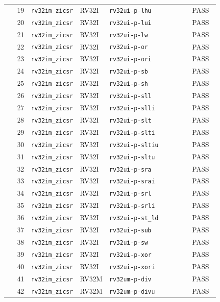 \begin{reporttable}
\begin{longtable}{@{}r p{0.22\linewidth}p{0.12\linewidth}p{0.39\linewidth}p{0.13\linewidth}@{}}
19 & \texttt{rv32im\_zicsr} & RV32I & \texttt{rv32ui-p-lhu} & PASS \\
20 & \texttt{rv32im\_zicsr} & RV32I & \texttt{rv32ui-p-lui} & PASS \\
21 & \texttt{rv32im\_zicsr} & RV32I & \texttt{rv32ui-p-lw} & PASS \\
22 & \texttt{rv32im\_zicsr} & RV32I & \texttt{rv32ui-p-or} & PASS \\
23 & \texttt{rv32im\_zicsr} & RV32I & \texttt{rv32ui-p-ori} & PASS \\
24 & \texttt{rv32im\_zicsr} & RV32I & \texttt{rv32ui-p-sb} & PASS \\
25 & \texttt{rv32im\_zicsr} & RV32I & \texttt{rv32ui-p-sh} & PASS \\
26 & \texttt{rv32im\_zicsr} & RV32I & \texttt{rv32ui-p-sll} & PASS \\
27 & \texttt{rv32im\_zicsr} & RV32I & \texttt{rv32ui-p-slli} & PASS \\
28 & \texttt{rv32im\_zicsr} & RV32I & \texttt{rv32ui-p-slt} & PASS \\
29 & \texttt{rv32im\_zicsr} & RV32I & \texttt{rv32ui-p-slti} & PASS \\
30 & \texttt{rv32im\_zicsr} & RV32I & \texttt{rv32ui-p-sltiu} & PASS \\
31 & \texttt{rv32im\_zicsr} & RV32I & \texttt{rv32ui-p-sltu} & PASS \\
32 & \texttt{rv32im\_zicsr} & RV32I & \texttt{rv32ui-p-sra} & PASS \\
33 & \texttt{rv32im\_zicsr} & RV32I & \texttt{rv32ui-p-srai} & PASS \\
34 & \texttt{rv32im\_zicsr} & RV32I & \texttt{rv32ui-p-srl} & PASS \\
35 & \texttt{rv32im\_zicsr} & RV32I & \texttt{rv32ui-p-srli} & PASS \\
36 & \texttt{rv32im\_zicsr} & RV32I & \texttt{rv32ui-p-st\_ld} & PASS \\
37 & \texttt{rv32im\_zicsr} & RV32I & \texttt{rv32ui-p-sub} & PASS \\
38 & \texttt{rv32im\_zicsr} & RV32I & \texttt{rv32ui-p-sw} & PASS \\
39 & \texttt{rv32im\_zicsr} & RV32I & \texttt{rv32ui-p-xor} & PASS \\
40 & \texttt{rv32im\_zicsr} & RV32I & \texttt{rv32ui-p-xori} & PASS \\
41 & \texttt{rv32im\_zicsr} & RV32M & \texttt{rv32um-p-div} & PASS \\
42 & \texttt{rv32im\_zicsr} & RV32M & \texttt{rv32um-p-divu} & PASS \\

\end{longtable}
\end{reporttable}
